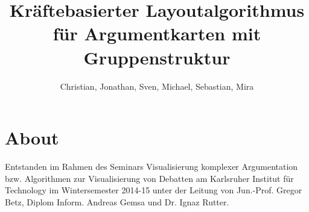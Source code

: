 \documentclass{algo-paper}
\title{Kräftebasierter Layoutalgorithmus für Argumentkarten mit Gruppenstruktur}
\subtitle{\vskip 2.5em Seminararbeit zur Veranstalltung Visualisierung komplexer Argumentation \vskip 1.5em}
\author{Christian, Jonathan, Sven, Michael, Sebastian, Mira}
\theoremstyle{changebreak}
\begin{document}
  


\cleardoublepage



\listoftodos
\cleardoublepage




\tableofcontents
\cleardoublepage












\chapter*{About}
Entstanden im Rahmen des Seminars Visualisierung komplexer Argumentation bzw. Algorithmen zur Visualisierung von Debatten 
am Karlsruher Institut für Technology im Wintersemester 2014-15 unter der Leitung von 
Jun.-Prof. Gregor Betz, Diplom Inform. Andreas Gemsa und Dr. Ignaz Rutter.
\end{document}
